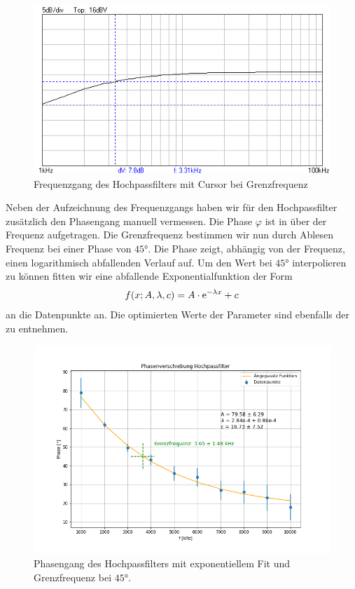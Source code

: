 \begin{figure}[H]
  \centering
  \includegraphics[width=.8\textwidth]{files/aufgabe3_hochpass.png}
  \caption{Frequenzgang des Hochpassfilters mit Cursor bei Grenzfrequenz}
  \label{fig:aufgabe3_hochpass}
\end{figure}

Neben der Aufzeichnung des Frequenzgangs haben wir für den Hochpassfilter zusätzlich den Phasengang manuell vermessen. Die Phase $\varphi$ ist in  über der Frequenz aufgetragen. Die Grenzfrequenz bestimmen wir nun durch Ablesen Frequenz bei einer Phase von $45\si{\degree}$. Die Phase zeigt, abhängig von der Frequenz, einen logarithmisch abfallenden Verlauf auf. Um den Wert bei $45\si{\degree}$ interpolieren zu können fitten wir eine abfallende Exponentialfunktion der Form
\begin{align}
  f(x; A,\lambda,c) = A \cdot \text{e}^{- \lambda x} + c
\end{align}
an die Datenpunkte an. Die optimierten Werte der Parameter sind ebenfalls der  zu entnehmen.


\begin{figure}[H]
  \centering
  \includegraphics[width=.8\textwidth]{files/phaseshift_hp_fit.png}
  \caption{Phasengang des Hochpassfilters mit exponentiellem Fit und Grenzfrequenz bei $45\si{\degree}$.}
  \label{fig:phaseshift_hp_fit}
\end{figure}


